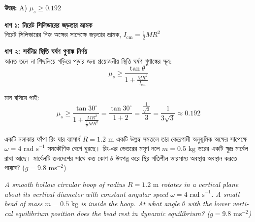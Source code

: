 \documentclass[12pt, a4paper]{article}
\begin{document}
{\begin{tcolorbox}[answerbox]
\textbf{\color{success} উত্তর:} A) $\mu_s \ge 0.192$
\end{tcolorbox}
\vspace{1em}

\begin{tcolorbox}[solutionbox={সমাধান (Solution)}]
\noindent
\textbf{ধাপ ১: নিরেট সিলিন্ডারের জড়তার ভ্রামক} \\
নিরেট সিলিন্ডারের নিজ অক্ষের সাপেক্ষে জড়তার ভ্রামক, $I_{\text{cm}} = \frac{1}{2} M R^2$

\vspace{0.5em}
\noindent\textbf{ধাপ ২: সর্বনিম্ন স্থিতি ঘর্ষণ গুণাঙ্ক নির্ণয়} \\
আনত তলে না পিছলিয়ে গড়িয়ে পড়ার জন্য প্রয়োজনীয় স্থিতি ঘর্ষণ গুণাঙ্কের সূত্র:
\[\mu_s \ge \frac{\tan\theta}{1 + \frac{M R^2}{I_{\text{cm}}}}\]

মান বসিয়ে পাই:
\[\mu_s \ge \frac{\tan 30^\circ}{1 + \frac{M R^2}{\frac{1}{2} M R^2}} = \frac{\tan 30^\circ}{1 + 2} = \frac{\frac{1}{\sqrt{3}}}{3} = \frac{1}{3\sqrt{3}} \approx \mathbf{0.192}\]
\end{tcolorbox}
\begin{tcolorbox}[questionbox={প্রশ্ন (Question) 10}]
\noindent
একটি নলাকার ফাঁপা রিং যার ব্যাসার্ধ $R = 1.2\text{ m}$ একটি উল্লম্ব সমতলে তার কেন্দ্রগামী অনুভূমিক অক্ষের সাপেক্ষে $\omega = 4\text{ rad s}^{-1}$ সমকৌণিক বেগে ঘুরছে। রিং-এর ভেতরের মসৃণ নলে $m = 0.5\text{ kg}$ ভরের একটি ক্ষুদ্র মার্বেল রাখা আছে। মার্বেলটি তলদেশের সাথে কত কোণ $\theta$ উৎপন্ন করে স্থির গতিশীল ভারসাম্য অবস্থায় অবস্থান করতে পারবে? ($g = 9.8\text{ ms}^{-2}$)

\vspace{0.8em}
\begin{english}
\noindent\textit{\color{darkgray}
A smooth hollow circular hoop of radius $R = 1.2\text{ m}$ rotates in a vertical plane about its vertical diameter with constant angular speed $\omega = 4\text{ rad s}^{-1}$. A small bead of mass $m = 0.5\text{ kg}$ is inside the hoop. At what angle $\theta$ with the lower vertical equilibrium position does the bead rest in dynamic equilibrium? ($g = 9.8\text{ ms}^{-2}$)
}
\end{english}
\end{tcolorbox}

}
\end{document}
